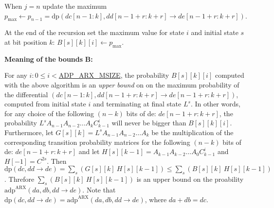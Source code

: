 \begin{DoxyItemize}
\begin{DoxyItemize}
\begin{DoxyItemize}
\begin{DoxyItemize}
\item \-When $j = n$ update the maximum $p_{\mathrm{max}} \leftarrow p_{n-1} = \mathrm{dp}(dc[n-1:k],dd[n-1+r:k+r] \rightarrow de[n-1+r:k+r])$.
\item \-At the end of the recursion set the maximum value for state $i$ and initial state $s$ at bit position $k$\-: $B[s][k][i] \leftarrow p_{\mathrm{max}}$.
\end{DoxyItemize}
\end{DoxyItemize}
\end{DoxyItemize}
\end{DoxyItemize}

{\bfseries \-Meaning} {\bfseries of} {\bfseries the} {\bfseries bounds} {\bfseries \-B\-:} 

\-For any $i: 0 \le i <$\hyperlink{adp-arx_8hh_af665f75e00f5755b68319f5907f75823}{\-A\-D\-P\-\_\-\-A\-R\-X\-\_\-\-M\-S\-I\-Z\-E}, the probability $B[s][k][i]$ computed with the above algorithm is an {\itshape upper\/} {\itshape bound\/} on on the maximum probability of the differential $(dc[n-1:k], dd[n-1+r:k+r] \rightarrow de[n-1+r:k+r])$, computed from initial state $i$ and terminating at final state $L^{s}$. \-In other words, for any choice of the following $(n-k)$ bits of de\-: $de[n-1+r:k+r]$, the probability $ L^{s} A_{n-1} A_{n-2} \ldots A_{k} C^{i}_{k-1}$ will never be bigger than $B[s][k][i]$. \-Furthermore, let $G[s][k] = L^{s} A_{n-1} A_{n-2} \ldots A_{k}$ be the multiplication of the corresponding transition probability matrices for the following $(n-k)$ bits of de\-: $de[n-1+r:k+r]$ and let $H[s][k-1] = A_{k-1} A_{k-2} \ldots A_{0} C^i_{k-1}$ and $H[-1] = C^{2s}$. \-Then $\mathrm{dp}(dc,dd \rightarrow de) = \sum_{s}(G[s][k]~ H[s][k-1]) \le \sum_{s}(B[s][k]~ H[s][k-1])$. \-Threfore $\sum_{s}(B[s][k]~ H[s][k-1])$ is an upper bound on the proability $\mathrm{adp}^{\mathrm{ARX}}(da,db,dd \rightarrow de)$. \-Note that $\mathrm{dp}(dc,dd \rightarrow de) = \mathrm{adp}^{\mathrm{ARX}}(da,db,dd \rightarrow de)$, where $da + db = dc$.

